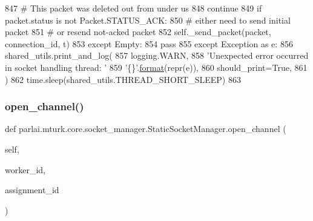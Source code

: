 \begin{DoxyCode}
847                                 \textcolor{comment}{# This packet was deleted out from under us}
848                                 \textcolor{keywordflow}{continue}
849                             \textcolor{keywordflow}{if} packet.status \textcolor{keywordflow}{is} \textcolor{keywordflow}{not} Packet.STATUS\_ACK:
850                                 \textcolor{comment}{# either need to send initial packet}
851                                 \textcolor{comment}{# or resend not-acked packet}
852                                 self.\_send\_packet(packet, connection\_id, t)
853                     \textcolor{keywordflow}{except} Empty:
854                         \textcolor{keywordflow}{pass}
855                 \textcolor{keywordflow}{except} Exception \textcolor{keyword}{as} e:
856                     shared\_utils.print\_and\_log(
857                         logging.WARN,
858                         \textcolor{stringliteral}{'Unexpected error occurred in socket handling thread: '}
859                         \textcolor{stringliteral}{'\{\}'}.\hyperlink{namespaceparlai_1_1chat__service_1_1services_1_1messenger_1_1shared__utils_a32e2e2022b824fbaf80c747160b52a76}{format}(repr(e)),
860                         should\_print=\textcolor{keyword}{True},
861                     )
862             time.sleep(shared\_utils.THREAD\_SHORT\_SLEEP)
863 
\end{DoxyCode}
\mbox{\label{classparlai_1_1mturk_1_1core_1_1socket__manager_1_1StaticSocketManager_a4672bc8a07f4ae122338ceb3a59cd54a}} 
\subsubsection{\texorpdfstring{open\+\_\+channel()}{open\_channel()}}
{\footnotesize\ttfamily def parlai.\+mturk.\+core.\+socket\+\_\+manager.\+Static\+Socket\+Manager.\+open\+\_\+channel (\begin{DoxyParamCaption}\item[{}]{self,  }\item[{}]{worker\+\_\+id,  }\item[{}]{assignment\+\_\+id }\end{DoxyParamCaption})}

